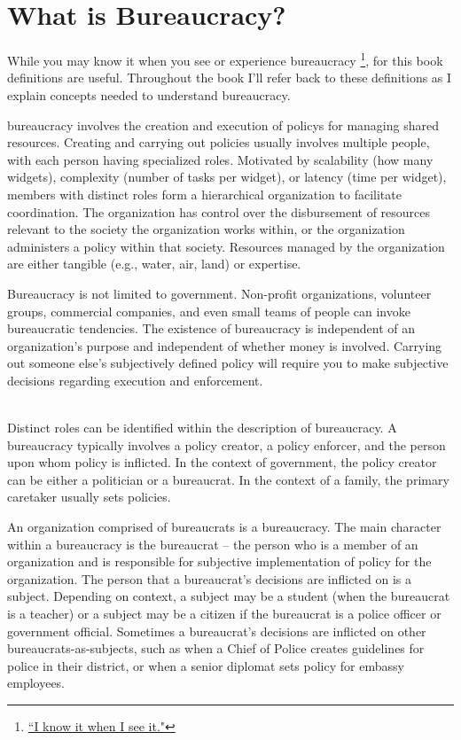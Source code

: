 \section{What is Bureaucracy?\label{sec:define-bureaucracy}}

While you may know it when you see or experience bureaucracy
\footnote{\href{https://en.wikipedia.org/wiki/I_know_it_when_I_see_it}{``I know it when I see it."}}, for this book definitions are useful. Throughout the book I'll refer back to these definitions as I explain concepts needed to understand bureaucracy.

\Gls{bureaucracy} involves the creation and execution of \glspl{policy} for managing shared resources. Creating and carrying out policies usually involves multiple people, with each person having specialized roles. Motivated by scalability (how many widgets), complexity (number of tasks per widget), or latency (time per widget), members with distinct roles form a hierarchical organization to facilitate coordination. The organization has control over the disbursement of resources relevant to the society the organization works within, or the organization administers a policy within that society. Resources managed by the organization are either tangible (e.g., water, air, land) or expertise.  

Bureaucracy is not limited to government. Non-profit organizations, volunteer groups, commercial companies, and even small teams of people can invoke bureaucratic tendencies. The existence of bureaucracy is independent of an organization's purpose and independent of whether money is involved. Carrying out someone else's subjectively defined policy will require you to make subjective decisions regarding execution and enforcement. 

\ \\

Distinct roles can be identified within the description of bureaucracy.
A bureaucracy typically involves a policy creator, a policy enforcer, and the person upon whom policy is inflicted. In the context of government, the policy creator can be either a politician or a bureaucrat. In the context of a family, the primary caretaker usually sets policies.

An organization comprised of bureaucrats is a \gls{bureaucracy}. The main character within a bureaucracy is the \gls{bureaucrat} -- the person who is a member of an organization and is responsible for subjective implementation of policy for the organization. The person that a bureaucrat's decisions are inflicted on is a \gls{subject}.  Depending on context, a subject may be a student (when the bureaucrat is a teacher)
or a subject may be a citizen if the bureaucrat is a police officer 
or government official. Sometimes a bureaucrat's decisions are inflicted on other bureaucrats-as-subjects, such as when a Chief of Police creates guidelines for police in their district, or when a senior diplomat sets policy for embassy employees. 


